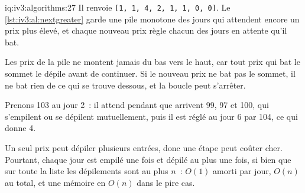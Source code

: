 \begin{solution}{iq:iv3:algorithms:27}
Il renvoie \texttt{[1, 1, 4, 2, 1, 1, 0, 0]}. Le \cref{lst:iv3:al:nextgreater} garde une pile monotone des jours qui attendent encore un prix plus élevé, et chaque nouveau prix règle chacun des jours en attente qu'il bat.
\label{lst:iv3:al:nextgreater}

Les prix de la pile ne montent jamais du bas vers le haut, car tout prix qui bat le sommet le dépile avant de continuer. Si le nouveau prix ne bat pas le sommet, il ne bat rien de ce qui se trouve dessous, et la boucle peut s'arrêter.

Prenons 103 au jour 2~: il attend pendant que arrivent 99, 97 et 100, qui s'empilent ou se dépilent mutuellement, puis il est réglé au jour 6 par 104, ce qui donne 4.

Un seul prix peut dépiler plusieurs entrées, donc une étape peut coûter cher. Pourtant, chaque jour est empilé une fois et dépilé au plus une fois, si bien que sur toute la liste les dépilements sont au plus $n$~: $O(1)$ amorti par jour, $O(n)$ au total, et une mémoire en $O(n)$ dans le pire cas.

\end{solution}

